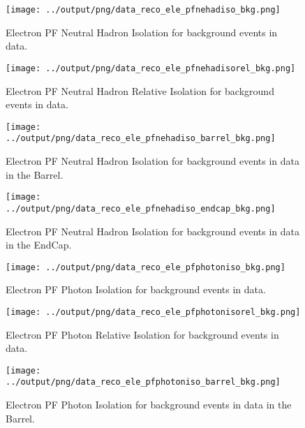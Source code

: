 \documentclass[11pt]{book}
\begin{document}
\begin{figure}[htb]
\centering
\texttt{[image: ../output/png/data\_reco\_ele\_pfnehadiso\_bkg.png]}
\caption{Electron PF Neutral Hadron Isolation for background events in data.}
\label{fig:data_ele_pfnehadiso_bkg}
\end{figure}

\begin{figure}[htb]
\centering
\texttt{[image: ../output/png/data\_reco\_ele\_pfnehadisorel\_bkg.png]}
\caption{Electron PF Neutral Hadron Relative Isolation for background events in data.}
\label{fig:data_ele_pfnehadisorel_bkg}
\end{figure}

\begin{figure}[htb]
\centering
\texttt{[image: ../output/png/data\_reco\_ele\_pfnehadiso\_barrel\_bkg.png]}
\caption{Electron PF Neutral Hadron Isolation for background events in data in the Barrel.}
\label{fig:data_ele_pfnehadiso_barrel_bkg}
\end{figure}

\begin{figure}[htb]
\centering
\texttt{[image: ../output/png/data\_reco\_ele\_pfnehadiso\_endcap\_bkg.png]}
\caption{Electron PF Neutral Hadron Isolation for background events in data in the EndCap.}
\label{fig:data_ele_pfnehadiso_endcap_bkg}
\end{figure}

\begin{figure}[htb]
\centering
\texttt{[image: ../output/png/data\_reco\_ele\_pfphotoniso\_bkg.png]}
\caption{Electron PF Photon Isolation for background events in data.}
\label{fig:data_ele_pfphotoniso_bkg}
\end{figure}

\begin{figure}[htb]
\centering
\texttt{[image: ../output/png/data\_reco\_ele\_pfphotonisorel\_bkg.png]}
\caption{Electron PF Photon Relative Isolation for background events in data.}
\label{fig:data_ele_pfphotonisorel_bkg}
\end{figure}

\begin{figure}[htb]
\centering
\texttt{[image: ../output/png/data\_reco\_ele\_pfphotoniso\_barrel\_bkg.png]}
\caption{Electron PF Photon Isolation for background events in data in the Barrel.}
\label{fig:data_ele_pfphotoniso_barrel_bkg}
\end{figure}
\end{document}
